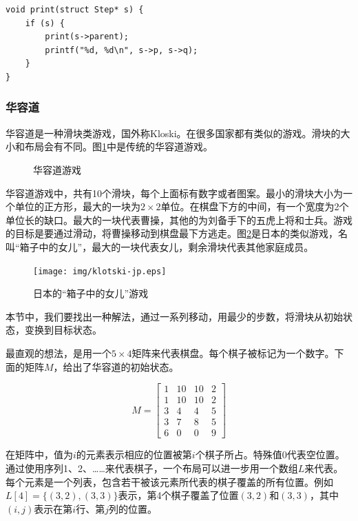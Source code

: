 \documentclass[UTF8]{article}
\begin{document}
\lstset{language=C}
\begin{lstlisting}
void print(struct Step* s) {
    if (s) {
        print(s->parent);
        printf("%d, %d\n", s->p, s->q);
    }
}
\end{lstlisting}

\subsubsection{华容道}

华容道是一种滑块类游戏，国外称Kloski。在很多国家都有类似的游戏。滑块的大小和布局会有不同。图\ref{fig:klotski-cn}中是传统的华容道游戏。

\begin{figure}[htbp]
 \centering
  \hspace{.01\textwidth}
 \caption{华容道游戏}
 \label{fig:klotski-cn}
\end{figure}

华容道游戏中，共有10个滑块，每个上面标有数字或者图案。最小的滑块大小为一个单位的正方形，最大的一块为$2 \times 2$单位。在棋盘下方的中间，有一个宽度为2个单位长的缺口。最大的一块代表曹操，其他的为刘备手下的五虎上将和士兵。游戏的目标是要通过滑动，将曹操移动到棋盘最下方逃走。图\ref{fig:klotski-jp}是日本的类似游戏，名叫“箱子中的女儿”，最大的一块代表女儿，剩余滑块代表其他家庭成员。

\begin{figure}[htbp]
 \centering
 \texttt{[image: img/klotski-jp.eps]}
 \caption{日本的“箱子中的女儿”游戏}
 \label{fig:klotski-jp}
\end{figure}

本节中，我们要找出一种解法，通过一系列移动，用最少的步数，将滑块从初始状态，变换到目标状态。

最直观的想法，是用一个$5 \times 4$矩阵来代表棋盘。每个棋子被标记为一个数字。下面的矩阵$M$，给出了华容道的初始状态。

\[
M = \left [
  \begin{array}{cccc}
  1 & 10 & 10 & 2 \\
  1 & 10 & 10 & 2 \\
  3 & 4 & 4 & 5 \\
  3 & 7 & 8 & 5 \\
  6 & 0 & 0 & 9
  \end{array}
\right ]
\]

在矩阵中，值为$i$的元素表示相应的位置被第$i$个棋子所占。特殊值0代表空位置。通过使用序列1、2、……来代表棋子，一个布局可以进一步用一个数组$L$来代表。每个元素是一个列表，包含若干被该元素所代表的棋子覆盖的所有位置。例如$L[4] = \{(3, 2), (3, 3)\}$表示，第4个棋子覆盖了位置$(3, 2)$和$(3, 3)$，其中$(i, j)$表示在第$i$行、第$j$列的位置。
\end{document}
